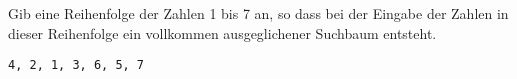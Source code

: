 \question[2]
Gib eine Reihenfolge der Zahlen 1 bis 7 an, so dass bei der
Eingabe der Zahlen in dieser Reihenfolge
ein vollkommen ausgeglichener Suchbaum entsteht.

\begin{solutionbox}{2cm}
\begin{lstlisting}
4, 2, 1, 3, 6, 5, 7
\end{lstlisting}
\end{solutionbox}
